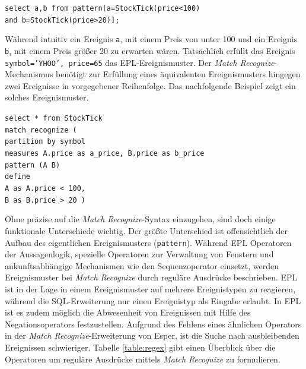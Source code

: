 \documentclass{acm_proc_article-sp}
\begin{document}
\texttt{select a,b from pattern[a=StockTick(price<100)\\
    and b=StockTick(price>20)];}

Während intuitiv ein Ereignis \texttt{a}, mit einem Preis von unter 100 und ein Ereignis 
\texttt{b}, mit einem Preis größer 20 zu erwarten wären. Tatsächlich erfüllt das Ereignis 
\texttt{{symbol='YHOO', price=65}} das EPL-Ereignismuster. Der \emph{Match 
Recognize}-Mechanismus benötigt zur Erfüllung eines äquivalenten Ereignismusters hingegen 
zwei Ereignisse in vorgegebener Reihenfolge. Das nachfolgende Beispiel zeigt ein solches 
Ereignismuster.

\texttt{select * from StockTick\\
match\_recognize (\\
partition by symbol\\
measures A.price as a\_price, B.price as b\_price\\
pattern (A B)\\
define \\
A as A.price < 100,\\
B as B.price > 20 )
}

Ohne präzise auf die \emph{Match Recognize}-Syntax einzugehen, sind doch einige 
funktionale Unterschiede wichtig. Der größte Unterschied ist offensichtlich der Aufbau 
des eigentlichen Ereignismusters (\texttt{pattern}). Während EPL Operatoren der 
Aussagenlogik, spezielle Operatoren zur Verwaltung von Fenstern und 
ankunftsabhängige Mechanismen wie den Sequenzoperator einsetzt, werden Ereignismuster bei 
\emph{Match Recognize} durch reguläre Ausdrücke beschrieben. EPL ist in der Lage in einem 
Ereignismuster auf mehrere Ereignistypen zu reagieren, während die SQL-Erweiterung nur 
einen Ereignistyp als Eingabe erlaubt. In EPL ist es zudem möglich die Abwesenheit von 
Ereignissen mit Hilfe des Negationsoperators festzustellen. Aufgrund des Fehlens 
eines ähnlichen Operators in der \emph{Match Recognize}-Erweiterung von Esper, ist die 
Suche nach ausbleibenden Ereignissen schwieriger. Tabelle \ref{table:regex} gibt einen 
Überblick über die Operatoren um reguläre Ausdrücke mittels \emph{Match Recognize} 
zu formulieren.
\end{document}
